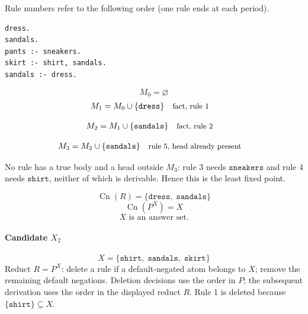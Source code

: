 \documentclass[a4paper,11pt]{article}
\newif\ifexplain
\newcommand{\explain}[1]{\ifexplain\begin{erklbox}#1\end{erklbox}\fi}
\newcommand{\why}[1]{\text{\small #1}}
\newcommand{\at}[1]{\texttt{#1}}
\begin{document}
Rule numbers refer to the following order (one rule ends at each period).
\begin{small}
\begin{verbatim}
dress.
sandals.
pants :- sneakers.
skirt :- shirt, sandals.
sandals :- dress.
\end{verbatim}
\end{small}
\explain{Beim Redukt bleibt die Kandidatenmenge fest. Wir entscheiden zuerst, welche Regeln wegfallen. Erst danach berechnen wir aus den verbleibenden positiven Regeln die kleinste abgeschlossene Menge. Ein Modell allein reicht nicht: Diese Menge muss genau der Kandidat sein.}
\[
M_0=\varnothing
\]
\begin{align*}
M_{1} &= M_{0}\cup \{\at{dress}\} && \why{fact, rule 1}
\end{align*}
\explain{Diese Regel hat keinen Körper. Ihr Kopf $\at{dress}$ ist damit ein Fakt und muss in die Menge.}
\begin{align*}
M_{2} &= M_{1}\cup \{\at{sandals}\} && \why{fact, rule 2}
\end{align*}
\explain{Diese Regel hat keinen Körper. Ihr Kopf $\at{sandals}$ ist damit ein Fakt und muss in die Menge.}
\begin{align*}
M_{3} &= M_{2}\cup \{\at{sandals}\} && \why{rule 5, head already present}
\end{align*}
\explain{Regel 5 feuert, weil $\at{dress}$ als Fact hergeleitet ist. Ihr Kopf $\at{sandals}$ ist aber schon in der Menge, also ändert sich nichts.}
No rule has a true body and a head outside $M_{3}$: rule 3 needs $\at{sneakers}$ and rule 4 needs $\at{shirt}$, neither of which is derivable. Hence this is the least fixed point.
\explain{Diese beiden Regeln bleiben für immer ungenutzt: $\at{sneakers}$ hat im Redukt nur Regel 3 selbst zur Verfügung, die ihren eigenen Kopf wieder verlangt, und $\at{shirt}$ kommt nirgends vor.}
\[
\operatorname{Cn}(R)=\{\at{dress},\;\at{sandals}\}
\]
\[
\operatorname{Cn}(P^X)=X
\]
\[
\boxed{X\text{ is an answer set.}}
\]
\paragraph{Candidate $X_2$}
\[
X=\{\at{shirt},\;\at{sandals},\;\at{skirt}\}
\]
Reduct $R=P^X$: delete a rule if a default-negated atom belongs to $X$; remove the remaining default negations. Deletion decisions use the order in $P$; the subsequent derivation uses the order in the displayed reduct $R$.
Rule 1 is deleted because $\{\at{shirt}\}\subseteq X$.
\end{document}
